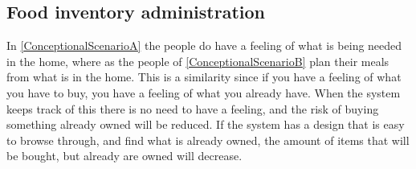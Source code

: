 \subsection{Food inventory administration}

In \ref{ConceptionalScenarioA} the people do have a feeling of what is being needed in the home, where as the people of \ref{ConceptionalScenarioB} plan their meals from what is in the home. This is a similarity since if you have a feeling of what you have to buy, you have a feeling of what you already have. When the system keeps track of this there is no need to have a feeling, and the risk of buying something already owned will be reduced. If the system has a design that is easy to browse through, and find what is already owned, the amount of items that will be bought, but already are owned will decrease.